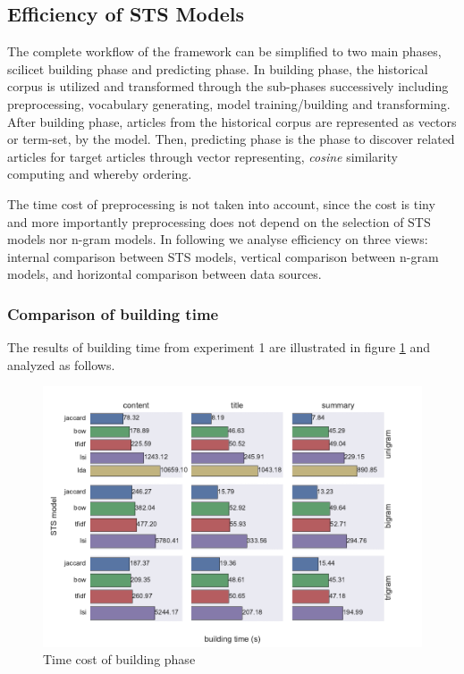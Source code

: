 \subsection{Efficiency of STS Models}
\label{sec:5.3}

The complete workflow of the framework can be simplified to two main phases, scilicet building phase and predicting phase. In building phase, the historical corpus is utilized and transformed through the sub-phases successively including preprocessing, vocabulary generating, model training/building and transforming. After building phase, articles from the historical corpus are represented as vectors or term-set, by the model. Then, predicting phase is the phase to discover related articles for target articles through vector representing, \textit{cosine} similarity computing and whereby ordering. 

The time cost of preprocessing is not taken into account, since the cost is tiny and more importantly preprocessing does not depend on the selection of STS models nor n-gram models. In following we analyse efficiency on three views: internal comparison between STS models, vertical comparison between n-gram models, and horizontal comparison between data sources. 

\subsubsection{Comparison of building time}

The results of building time from experiment 1 are illustrated in figure \ref{fig:build_time} and analyzed as follows. 

\begin{figure}[!htb]
    \centering
    \includegraphics[width=\textwidth]{fig/building_time}
    \caption{Time cost of building phase}
    \label{fig:build_time}
\end{figure}

